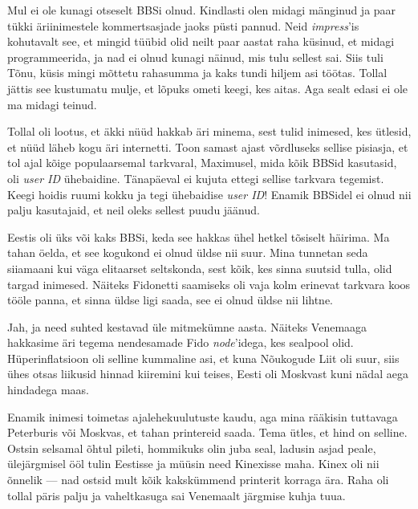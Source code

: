 Mul ei ole kunagi otseselt BBSi olnud. Kindlasti olen midagi mänginud ja paar tükki äriinimestele kommertsasjade jaoks püsti pannud. Neid 
\emph{impress}'is kohutavalt see, et mingid tüübid olid neilt paar 
aastat raha küsinud, et midagi programmeerida, ja nad ei olnud kunagi näinud, 
mis tulu sellest sai. Siis tuli Tõnu, küsis mingi mõttetu 
rahasumma ja kaks tundi hiljem asi töötas. Tollal jättis see
kustumatu mulje, et lõpuks ometi keegi, kes aitas. Aga sealt edasi 
ei ole ma midagi teinud. 


Tollal oli lootus, et äkki nüüd hakkab äri minema, sest tulid inimesed, kes 
ütlesid, et nüüd läheb kogu äri internetti. Toon samast ajast 
võrdluseks sellise pisiasja, et tol ajal kõige populaarsemal tarkvaral, 
Maximusel, mida kõik BBSid kasutasid, oli \emph{user ID} ühebaidine. Tänapäeval ei kujuta ettegi sellise tarkvara tegemist. 
Keegi hoidis ruumi kokku ja tegi ühebaidise \emph{user ID}! Enamik BBSidel ei 
olnud nii palju kasutajaid, et neil oleks sellest puudu jäänud. 


Eestis oli üks või kaks BBSi, keda see hakkas ühel hetkel tõsiselt häirima. Ma 
tahan öelda, et see kogukond ei olnud üldse nii suur. Mina tunnetan seda siiamaani 
kui väga elitaarset seltskonda, sest kõik, kes sinna 
suutsid tulla, olid targad inimesed. Näiteks Fidonetti saamiseks oli vaja kolm erinevat tarkvara koos tööle 
panna, et sinna üldse ligi saada, see ei olnud üldse nii lihtne. 


Jah, ja need suhted kestavad üle mitmekümne aasta. 
Näiteks Venemaaga hakkasime äri tegema nendesamade Fido \emph{node}'idega, 
kes sealpool olid. Hüperinflatsioon oli selline kummaline asi, et kuna 
Nõukogude Liit oli suur, siis ühes otsas liikusid hinnad kiiremini kui teises, 
Eesti oli Moskvast kuni nädal aega hindadega maas. 


Enamik inimesi toimetas ajalehekuulutuste kaudu, aga mina rääkisin tuttavaga Peterburis või Moskvas, et 
tahan printereid saada. Tema ütles, et hind on selline. 
Ostsin selsamal õhtul pileti, hommikuks olin juba seal, ladusin asjad 
peale, ülejärgmisel ööl tulin Eestisse ja müüsin need 
Kinexisse maha. Kinex oli 
nii õnnelik --- nad ostsid mult kõik kakskümmend printerit korraga ära. Raha oli tollal
päris palju ja vaheltkasuga sai Venemaalt järgmise kuhja tuua.

